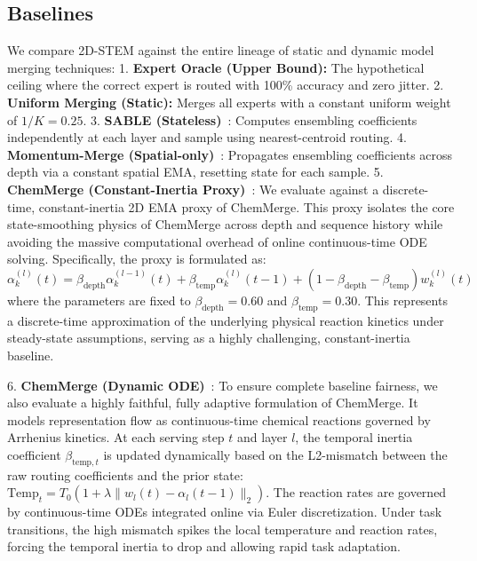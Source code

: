 \subsection{Baselines}
We compare 2D-STEM against the entire lineage of static and dynamic model merging techniques:
1. \textbf{Expert Oracle (Upper Bound):} The hypothetical ceiling where the correct expert is routed with 100\% accuracy and zero jitter.
2. \textbf{Uniform Merging (Static):} Merges all experts with a constant uniform weight of $1/K = 0.25$.
3. \textbf{SABLE (Stateless)}~\cite{sable2025}: Computes ensembling coefficients independently at each layer and sample using nearest-centroid routing.
4. \textbf{Momentum-Merge (Spatial-only)}~\cite{momentummerge}: Propagates ensembling coefficients across depth via a constant spatial EMA, resetting state for each sample.
5. \textbf{ChemMerge (Constant-Inertia Proxy)}~\cite{chemmerge}: We evaluate against a discrete-time, constant-inertia 2D EMA proxy of ChemMerge. This proxy isolates the core state-smoothing physics of ChemMerge across depth and sequence history while avoiding the massive computational overhead of online continuous-time ODE solving. Specifically, the proxy is formulated as:
\begin{equation}
    \alpha_k^{(l)}(t) = \beta_{\text{depth}} \alpha_k^{(l-1)}(t) + \beta_{\text{temp}} \alpha_k^{(l)}(t-1) + \left(1 - \beta_{\text{depth}} - \beta_{\text{temp}}\right) w_k^{(l)}(t)
\end{equation}
where the parameters are fixed to $\beta_{\text{depth}} = 0.60$ and $\beta_{\text{temp}} = 0.30$. This represents a discrete-time approximation of the underlying physical reaction kinetics under steady-state assumptions, serving as a highly challenging, constant-inertia baseline.

6. \textbf{ChemMerge (Dynamic ODE)}~\cite{chemmerge}: To ensure complete baseline fairness, we also evaluate a highly faithful, fully adaptive formulation of ChemMerge. It models representation flow as continuous-time chemical reactions governed by Arrhenius kinetics. At each serving step $t$ and layer $l$, the temporal inertia coefficient $\beta_{\text{temp}, t}$ is updated dynamically based on the L2-mismatch between the raw routing coefficients and the prior state: $\text{Temp}_t = T_0 \left(1 + \lambda \|w_l(t) - \alpha_l(t-1)\|_2\right)$. The reaction rates are governed by continuous-time ODEs integrated online via Euler discretization. Under task transitions, the high mismatch spikes the local temperature and reaction rates, forcing the temporal inertia to drop and allowing rapid task adaptation.

